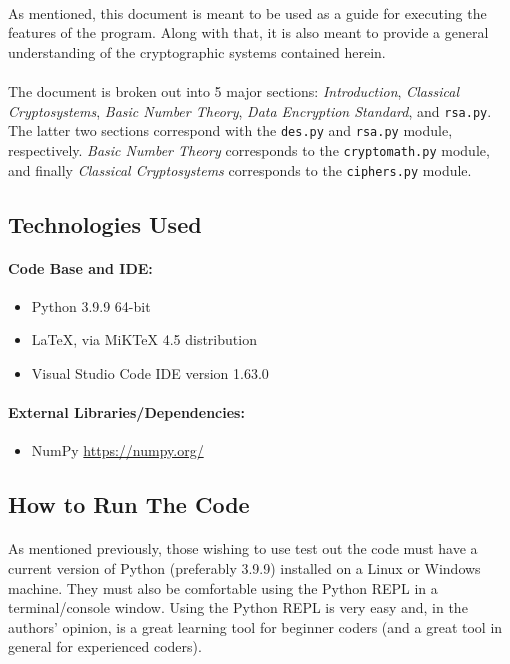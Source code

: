 \documentclass[12pt,a4paper]{article}
\begin{document}
\paragraph{}
As mentioned, this document is meant to be used as a guide for executing the 
features of the program.  Along with that, it is also meant to provide a general 
understanding of the cryptographic systems contained herein.

\paragraph{}
The document is broken out into 5 major sections:  \textit{Introduction}, 
\textit{Classical Cryptosystems}, \textit{Basic Number Theory}, 
\textit{Data Encryption Standard}, and \verb|rsa.py|.  The latter two sections 
correspond with the \verb|des.py| and \verb|rsa.py| module, respectively.  
\textit{Basic Number Theory} corresponds to the \verb|cryptomath.py| 
module, and finally \textit{Classical Cryptosystems} corresponds to the 
\verb|ciphers.py| module.

\subsection{Technologies Used}
\paragraph{Code Base and IDE:}
\begin{itemize}
  \item Python 3.9.9 64-bit
  \item LaTeX, via MiKTeX 4.5 distribution
  \item Visual Studio Code IDE version 1.63.0
\end{itemize}

\paragraph{External Libraries/Dependencies:}
\begin{itemize}
  \item NumPy \hyperlink{numpy.org}{https://numpy.org/}
\end{itemize}

\subsection{How to Run The Code}
\paragraph{}
As mentioned previously, those wishing to use test out the code must have a 
current version of Python (preferably 3.9.9) installed on a Linux or Windows 
machine.  They must also be comfortable using the Python REPL in a 
terminal/console window.  Using the Python REPL is very easy and, in the 
authors' opinion, is a great learning tool for beginner coders (and a great 
tool in general for experienced coders).
\end{document}
